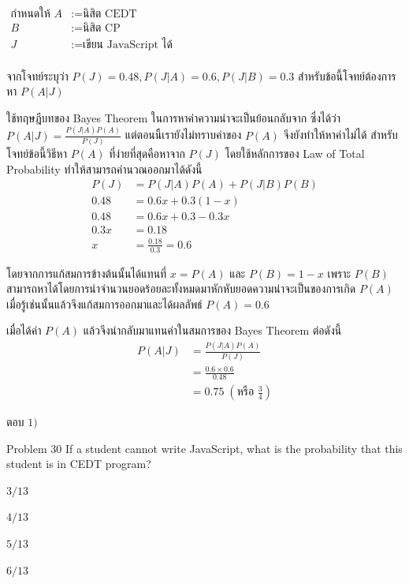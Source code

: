 \documentclass[11pt]{scrartcl}
\begin{document}
\begin{solutionbox}
  \begin{flushleft}
  $\begin{aligned}
    \text{กำหนดให้ } A &:= \text{นิสิต CEDT} \\
    B &:= \text{นิสิต CP} \\
    J &:= \text{เขียน JavaScript ได้} \\
  \end{aligned}$
  \end{flushleft}

  จากโจทย์ระบุว่า $P(J) = 0.48, P(J|A) = 0.6, P(J|B) = 0.3$ สำหรับข้อนี้โจทย์ต้องการหา $P(A|J)$

  ใช้ทฤษฎีบทของ Bayes Theorem ในการหาค่าความน่าจะเป็นย้อนกลับจาก ซึ่งได้ว่า $P(A|J) = \frac{P(J|A)P(A)}{P(J)}$ แต่ตอนนี้เรายังไม่ทราบค่าของ $P(A)$ จึงยังทำให้หาค่าไม่ได้
  สำหรับโจทย์ข้อนี้วิธีหา $P(A)$ ที่ง่ายที่สุดคือหาจาก $P(J)$ โดยใช้หลักการของ Law of Total Probability ทำให้สามารถคำนวณออกมาได้ดังนี้
  \begin{align*}
    P(J) &= P(J|A)P(A) + P(J|B)P(B) \\
    0.48  &= 0.6x + 0.3(1-x) \\
    0.48  &= 0.6x + 0.3 - 0.3x \\
    0.3x  &= 0.18 \\
    x  &= \frac{0.18}{0.3} = 0.6
  \end{align*}

  โดยจากการแก้สมการข้างต้นนั้นได้แทนที่ $x = P(A)$ และ $P(B) = 1-x$ เพราะ $P(B)$ สามารถหาได้โดยการนำจำนวนยอดร้อยละทั้งหมดมาหักหับยอดความน่าจะเป็นของการเกิด $P(A)$ เมื่อรู้เช่นนั้นแล้วจึงแก้สมการออกมาและได้ผลลัพธ์ $P(A) = 0.6$ 

  เมื่อได้ค่า $P(A)$ แล้วจึงนำกลับมาแทนค่าในสมการของ Bayes Theorem ต่อดังนี้
  \begin{align*}
    P(A|J) &= \frac{P(J|A)P(A)}{P(J)} \\
          &= \frac{0.6 \times 0.6}{0.48} \\
          &= 0.75 \; (\text{หรือ $\frac{3}{4}$})
  \end{align*}

  ตอบ $\boxed{1)}$
\end{solutionbox}
 
\begin{problembox}{Problem 30}
If a student cannot write JavaScript, what is the probability that this student is in CEDT program?
 
\begin{choices}
\item $3/13$
\item $4/13$
\item $5/13$
\item $6/13$
\end{choices}
\end{problembox}
\end{document}

